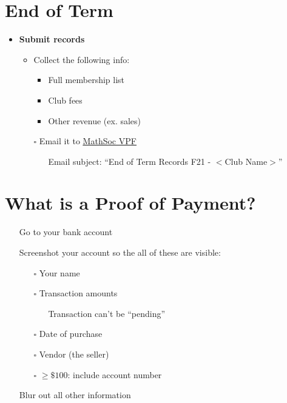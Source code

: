 \documentclass[utf8]{article}
\makeatletter
\newcommand{\termandyear}{F21 }
\renewcommand{\labelitemi}{$\square$}
\renewcommand\labelitemii{\textbullet}
\renewcommand\labelitemiii{$\square$}
\newcommand{\MathSocVPF}{\href{mailto:vpf@mathsoc.uwaterloo.ca}{\underline{MathSoc VPF} }}
\makeatother
\begin{document}
\renewcommand{\labelitemi}{$\square$}
\renewcommand\labelitemii{\textbullet}
\renewcommand\labelitemiii{$\square$}

\section*{End of Term}
\begin{itemize}
    \item \textbf{Submit records}
    \begin{itemize}
        \item Collect the following info: 
        \begin{itemize}
            \item Full membership list
            \item Club fees
            \item Other revenue (ex. sales)
        \end{itemize}
        \item[$\square$] Email it to \MathSocVPF
            \begin{itemize}
                \item[\textperiodcentered] Email subject: ``End of Term Records \termandyear - $<$Club Name$>$''
            \end{itemize}
    \end{itemize}
\end{itemize}

\section*{What is a Proof of Payment?}
\label{sec:pop}
\begin{itemize}
    \item[\textbullet] Go to your bank account
    \item[\textbullet] Screenshot your account so the all of these are visible:
    \begin{itemize}
        \item[$\square$] Your name 
        \item[$\square$] Transaction amounts
        \begin{itemize}
            \item[\textperiodcentered] Transaction can't be ``pending''
        \end{itemize} 
        \item[$\square$] Date of purchase
        \item[$\square$] Vendor (the seller) 
        \item[$\square$] $\geq \$100$: include account number 
    \end{itemize}
    \item[\textbullet] Blur out all other information
\end{itemize}
\end{document}
